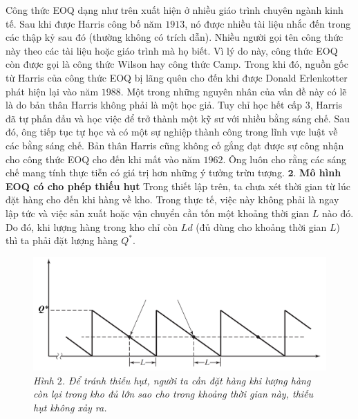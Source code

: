 \begin{multicols}{2}
\begin{figure}[H]
		\vspace*{-10pt}
	\end{figure}
	Công thức EOQ dạng như trên xuất hiện ở nhiều giáo trình chuyên ngành kinh tế. Sau khi được Harris công bố năm $1913$, nó được nhiều tài liệu nhắc đến trong các thập kỷ sau đó (thường không có trích dẫn). Nhiều người gọi tên công thức này theo các tài liệu hoặc giáo trình mà họ biết. Vì lý do này, công thức EOQ còn được gọi là công thức Wilson hay công thức Camp. Trong khi đó, nguồn gốc từ Harris của công thức EOQ bị lãng quên cho đến khi được Donald Erlenkotter phát hiện lại vào năm $1988$. Một trong những nguyên nhân của vấn đề này có lẽ là do bản thân Harris không phải là một học giả. Tuy chỉ học hết cấp $3$, Harris đã tự phấn đấu và học việc để trở thành một kỹ sư với nhiều bằng sáng chế. Sau đó, ông tiếp tục tự học và có một sự nghiệp thành công trong lĩnh vực luật về các bằng sáng chế. Bản thân Harris cũng không cố gắng đạt được sự công nhận cho công thức EOQ cho đến khi mất vào năm $1962$. Ông luôn cho rằng các sáng chế mang tính thực tiễn có giá trị hơn những ý tưởng trừu tượng.
	\vskip 0.1cm
	$\pmb{2.}$ \textbf{\color{toanhocdoisong}Mô hình EOQ có cho phép thiếu hụt}
	\vskip 0.1cm
	Trong thiết lập trên, ta chưa xét thời gian từ lúc đặt hàng cho đến khi hàng về kho. Trong thực tế, việc này không phải là ngay lập tức và việc sản xuất hoặc vận chuyển cần tốn một khoảng thời gian $L$ nào đó. Do đó, khi lượng hàng trong kho chỉ còn $Ld$ (đủ dùng cho khoảng thời gian $L$) thì ta phải đặt lượng hàng $Q^*$.
	\begin{figure}[H]
		\vspace*{-5pt}
		\centering
		\captionsetup{labelformat= empty, justification=centering}
		\includegraphics[width= 1\linewidth]{3}
		\caption{\small\textit{\color{toanhocdoisong}Hình $2$. Để tránh thiếu hụt, người ta cần đặt hàng khi lượng hàng còn lại trong kho đủ lớn sao cho trong khoảng thời gian này, thiếu hụt không xảy ra.}}
		\vspace*{-10pt}
	\end{figure}

\end{multicols}
